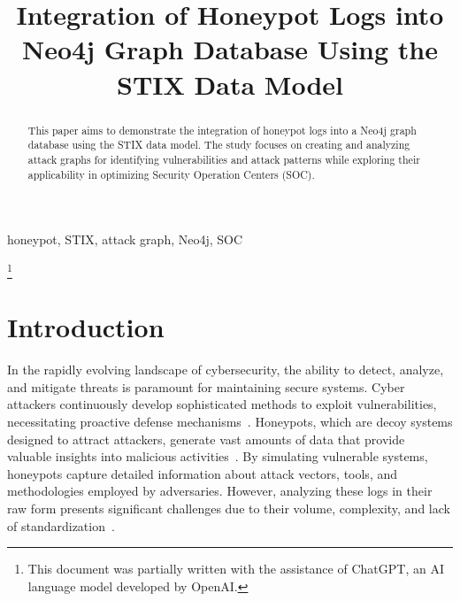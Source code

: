 \documentclass[conference]{IEEEtran}
\begin{document}
\title{Integration of Honeypot Logs into Neo4j Graph Database Using the STIX Data Model}

\author{
}

\maketitle

\begin{abstract}
This paper aims to demonstrate the integration of honeypot logs into a Neo4j graph database using the STIX data model. The study focuses on creating and analyzing attack graphs for identifying vulnerabilities and attack patterns while exploring their applicability in optimizing Security Operation Centers (SOC).
\end{abstract}

\begin{IEEEkeywords}
honeypot, STIX, attack graph, Neo4j, SOC
\end{IEEEkeywords}

\thanks{This document was partially written with the assistance of ChatGPT, an AI language model developed by OpenAI.\cite{openai2024chatgpt}}

\section{Introduction}

In the rapidly evolving landscape of cybersecurity, the ability to detect, analyze, and mitigate threats is paramount for maintaining secure systems. Cyber attackers continuously develop sophisticated methods to exploit vulnerabilities, necessitating proactive defense mechanisms~\cite{mirkovic2004taxonomy}. Honeypots, which are decoy systems designed to attract attackers, generate vast amounts of data that provide valuable insights into malicious activities~\cite{spitzner2003honeypots, provos2007virtual}. By simulating vulnerable systems, honeypots capture detailed information about attack vectors, tools, and methodologies employed by adversaries. However, analyzing these logs in their raw form presents significant challenges due to their volume, complexity, and lack of standardization~\cite{katti2018honeypot}.
\end{document}
